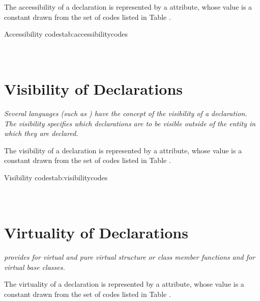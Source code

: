 The accessibility of a declaration 
is\hypertarget{chap:DWATaccessibilityattribute}{}
represented by a 
\DWATaccessibilityDEFN{} 
attribute, whose value is a constant drawn from the set of codes 
listed in Table .

\begin{simplenametable}[1.9in]{Accessibility codes}{tab:accessibilitycodes}
\DWACCESSpublicTARG{}          \\
\DWACCESSprivateTARG{}        \\
\DWACCESSprotectedTARG{}    \\
\end{simplenametable}

\section{Visibility of Declarations}
\label{chap:visibilityofdeclarations}

\textit{Several languages (such as ) 
have the concept of the visibility of a declaration. The
visibility specifies which declarations are to be 
visible outside of the entity in which they are
declared.}

The\hypertarget{chap:DWATvisibilityvisibilityofdeclaration}{}
visibility of a declaration is represented 
by a \DWATvisibilityDEFN{}
attribute, whose value is a
constant drawn from the set of codes listed in 
Table .

\begin{simplenametable}[1.5in]{Visibility codes}{tab:visibilitycodes}
\DWVISlocalTARG{}          \\
\DWVISexportedTARG{}    \\
\DWVISqualifiedTARG{}  \\
\end{simplenametable}

\section{Virtuality of Declarations}
\label{chap:virtualityofdeclarations}
\textit{ provides for virtual and pure virtual structure or class
member functions and for virtual base classes.}

The\hypertarget{chap:DWATvirtualityvirtualityindication}{}
virtuality of a declaration is represented by a
\DWATvirtualityDEFN{}
attribute, whose value is a constant drawn
from the set of codes listed in 
Table .

